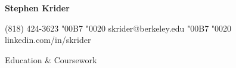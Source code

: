 \documentclass{article}
\begin{document}
	\begin{center}
		{\namefont \fontsize{18}{24}\selectfont \textbf{Stephen Krider}}

		\vspace{0.075in}
		
		(818) 424-3623
		\char"00B7 
		\char"0020
		skrider@berkeley.edu 
		\char"00B7 
		\char"0020
		linkedin.com/in/skrider
	\end{center}
	\vspace{-0.245in}
	\makebox[\linewidth]{\rule{\textwidth}{0.8pt}}
	\begin{center}
		Education \& Coursework
	\end{center}
\end{document}
